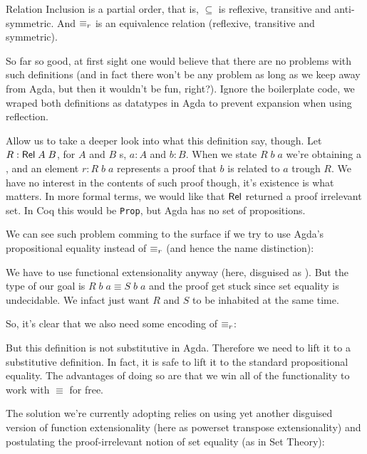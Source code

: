 \begin{lemma}
Relation Inclusion is a partial order, that is, $\subseteq$ is reflexive, transitive and anti-symmetric.
And $\equiv_r$ is an equivalence relation (reflexive, transitive and symmetric).\\
\end{lemma}

So far so good, at first sight one would believe that there are no problems with such definitions
(and in fact there won't be any problem as long as we keep away from Agda, but then it wouldn't be fun, right?). 
Ignore the boilerplate code, we wraped both definitions
as datatypes in Agda to prevent expansion when using reflection.


Allow us to take a deeper look into what this definition say, though. 
Let $R : \D{Rel}\;A\;B$, for $A$ and $B$ s, $a : A$ and $b : B$. When we
state $R\;b\;a$ we're obtaining a , and an element $r : R\;b\;a$ represents
a proof that $b$ is related to $a$ trough $R$. We have no interest in the contents of
such proof though, it's existence is what matters. In more formal terms, we would like
that $\D{Rel}$ returned a proof irrelevant set. In Coq this would be \texttt{\small Prop}, but
Agda has no set of propositions.

We can see such problem comming to the surface if we try to use Agda's propositional equality 
instead of $\equiv_r$ (and hence the name distinction):


We have to use functional extensionality anyway (here, disguised as ). But the 
type of our goal is $R\;b\;a \equiv S\;b\;a$ and the proof get stuck since set equality is
undecidable. We infact just want $R$ and $S$ to be inhabited at
the same time.

So, it's clear that we also need some encoding of $\equiv_r$:


But this definition is not substitutive in Agda. Therefore we need to lift it to
a substitutive definition. In fact, it is safe to lift it to the standard propositional equality.
The advantages of doing so are that we win all of the functionality to work with $\equiv$ for free.

The solution we're currently adopting relies on using yet another disguised version of
function extensionality (here as powerset transpose extensionality) 
and postulating the proof-irrelevant notion of set equality (as in Set Theory):


